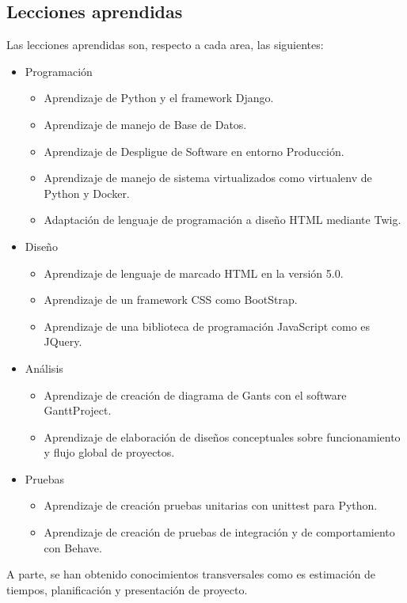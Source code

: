 \documentclass[12pt,letterpaper]{report}
\begin{document}
	\subsection{Lecciones aprendidas}
		Las lecciones aprendidas son, respecto a cada area, las siguientes:
		\begin{itemize}
			\item Programación
			\begin{itemize}
				\item Aprendizaje de Python y el framework Django.
				\item Aprendizaje de manejo de Base de Datos.
				\item Aprendizaje de Despligue de Software en entorno Producción.
				\item Aprendizaje de manejo de sistema virtualizados como virtualenv de Python y Docker.
				\item Adaptación de lenguaje de programación a diseño HTML mediante Twig.
			\end{itemize}
			\item Diseño
			\begin{itemize}
				\item Aprendizaje de lenguaje de marcado HTML en la versión 5.0.
				\item Aprendizaje de un framework CSS como BootStrap.
				\item Aprendizaje de una biblioteca de programación JavaScript como es JQuery.
			\end{itemize}
			\item Análisis
			\begin{itemize}
				\item Aprendizaje de creación de diagrama de Gants con el software GanttProject.
				\item Aprendizaje de elaboración de diseños conceptuales sobre funcionamiento y flujo global de proyectos.
			\end{itemize}
			\item Pruebas
			\begin{itemize}
				\item Aprendizaje de creación pruebas unitarias con unittest para Python.
				\item Aprendizaje de creación de pruebas de integración y de comportamiento con Behave.
			\end{itemize}
		\end{itemize}
		A parte, se han obtenido conocimientos transversales como es estimación de
		tiempos, planificación y presentación de proyecto.
\end{document}
